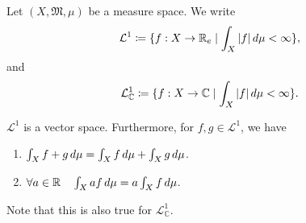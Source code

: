 \documentclass[notoc,notitlepage]{tufte-book}
\begin{document}
\begin{notation}
  Let $(X, \mathfrak{M}, \mu)$ be a measure space.
  We write
  \begin{equation*}
    \mathcal{L}^1 \coloneqq \{ f : X \to \mathbb{R}_e
          \mid \int_{X} \left|f\right| \mathop{}\!d{\mu} < \infty \},
  \end{equation*}
  and
  \begin{equation*}
    \mathcal{L}_{\mathbb{C}}^1 \coloneqq \{ f : X \to \mathbb{C}
                    \mid \int_{X} \left|f\right| \mathop{}\!d{\mu} < \infty \}.
  \end{equation*}
\end{notation}

\begin{propo}\label{propo:cursive_l_1_is_a_vector_space}
  $\mathcal{L}^1$ is a vector space.
  Furthermore, for $f, g \in \mathcal{L}^1$, we have
  \begin{enumerate}
    \item $\int_{X} f + g \mathop{}\!d{\mu} = \int_{X} f \mathop{}\!d{\mu} + \int_{X} g \mathop{}\!d{\mu}$.
    \item $\forall a \in \mathbb{R}\quad
      \int_{X} af \mathop{}\!d{\mu} = a \int_{X} f \mathop{}\!d{\mu}$.
  \end{enumerate}
  Note that this is also true for $\mathcal{L}_{\mathbb{C}}^1$.
\end{propo}
\end{document}

